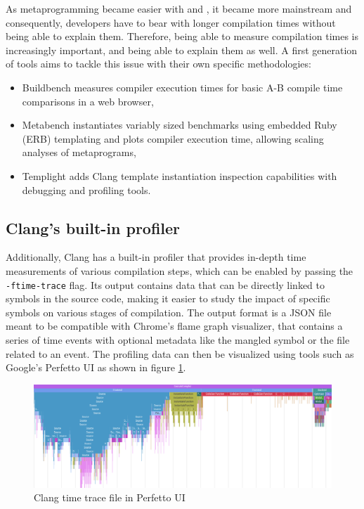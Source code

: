 \documentclass[../../main.tex]{subfiles}
\begin{document}
As metaprogramming became easier with  and , it became more mainstream
and consequently, developers have to bear with longer compilation times without
being able to explain them. Therefore, being able to measure compilation times
is increasingly important, and being able to explain them as well. A first
generation of tools aims to tackle this issue with their own specific
methodologies:

\begin{itemize}
\item Buildbench\cite{buildbench} measures compiler execution times for basic
      A-B compile time comparisons in a web browser,

\item Metabench\cite{metabench} instantiates variably sized benchmarks using
      embedded Ruby (ERB) templating and plots compiler execution time, allowing
      scaling analyses of metaprograms,

      \item Templight\cite{templight} adds Clang template instantiation inspection
      capabilities with debugging and profiling tools.
\end{itemize}

\subsection{Clang's built-in profiler}

Additionally, Clang has a built-in profiler\cite{time-trace} that provides
in-depth time measurements of various compilation steps, which can be enabled by
passing the \lstinline{-ftime-trace} flag. Its output contains data that can be
directly linked to symbols in the source code, making it easier to study the
impact of specific symbols on various stages of compilation. The output format
is a JSON file meant to be compatible with Chrome's flame graph visualizer, that
contains a series of time events with optional metadata like the mangled \cpp
symbol or the file related to an event. The profiling data can then be
visualized using tools such as Google's Perfetto UI as shown in figure
\ref{fig:perfetto-time-trace-ui}.

\begin{figure}[h]
\includegraphics[scale=0.264]{images/perfetto-ui.png}
\caption{Clang time trace file in Perfetto UI}
\label{fig:perfetto-time-trace-ui}
\end{figure}
\end{document}
